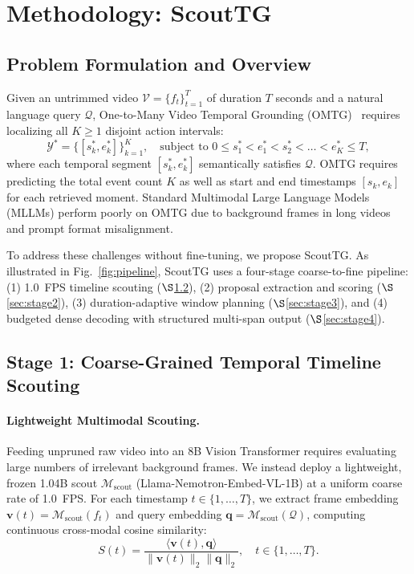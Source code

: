 \section{Methodology: ScoutTG}
\label{sec:method}

\subsection{Problem Formulation and Overview}
\label{sec:overview}

Given an untrimmed video $\mathcal{V} = \{f_t\}_{t=1}^{T}$ of duration $T$ seconds and a natural language query $\mathcal{Q}$, One-to-Many Video Temporal Grounding (OMTG)~\cite{omtg2026} requires localizing all $K \ge 1$ disjoint action intervals:
\begin{equation}
    \mathcal{Y}^* = \big\{ [s_k^*, e_k^*] \big\}_{k=1}^{K}, \quad \text{subject to } 0 \le s_1^* < e_1^* < s_2^* < \dots < e_K^* \le T,
    \label{eq:omtg_formulation}
\end{equation}
where each temporal segment $[s_k^*, e_k^*]$ semantically satisfies $\mathcal{Q}$. OMTG requires predicting the total event count $K$ as well as start and end timestamps $[s_k, e_k]$ for each retrieved moment. Standard Multimodal Large Language Models (MLLMs) perform poorly on OMTG due to background frames in long videos and prompt format misalignment.

To address these challenges without fine-tuning, we propose ScoutTG. As illustrated in Fig.~\ref{fig:pipeline}, ScoutTG uses a four-stage coarse-to-fine pipeline: (1) 1.0~FPS timeline scouting ($\S$\ref{sec:stage1}), (2) proposal extraction and scoring ($\S$\ref{sec:stage2}), (3) duration-adaptive window planning ($\S$\ref{sec:stage3}), and (4) budgeted dense decoding with structured multi-span output ($\S$\ref{sec:stage4}).


\subsection{Stage 1: Coarse-Grained Temporal Timeline Scouting}
\label{sec:stage1}

\paragraph{Lightweight Multimodal Scouting.} Feeding unpruned raw video into an 8B Vision Transformer requires evaluating large numbers of irrelevant background frames. We instead deploy a lightweight, frozen 1.04B scout $\mathcal{M}_{\text{scout}}$ (Llama-Nemotron-Embed-VL-1B) at a uniform coarse rate of 1.0~FPS. For each timestamp $t \in \{1, \dots, T\}$, we extract frame embedding $\mathbf{v}(t) = \mathcal{M}_{\text{scout}}(f_t)$ and query embedding $\mathbf{q} = \mathcal{M}_{\text{scout}}(\mathcal{Q})$, computing continuous cross-modal cosine similarity:
\begin{equation}
    S(t) = \frac{\langle \mathbf{v}(t), \mathbf{q} \rangle}{\|\mathbf{v}(t)\|_2 \|\mathbf{q}\|_2}, \quad t \in \{1, \dots, T\}.
    \label{eq:cosine_sim}
\end{equation}

